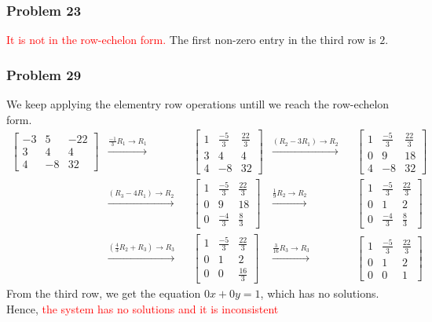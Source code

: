 \documentclass[a4paper,12pt]{article}
\begin{document}
\subsubsection*{Problem 23}
\textcolor{red}{It is not in the row-echelon form.} The first non-zero entry in the third row is $2$.
\subsubsection*{Problem 29}
We keep applying the elementry row operations untill we reach the row-echelon form.
\begin{align*}\begin{bmatrix}
  -3 & 5 & -22 \\
  3 & 4 & 4 \\
  4 & -8 & 32
\end{bmatrix}
&\xrightarrow{\frac{-1}{3}R_1\to R_1}& &\begin{bmatrix}
  1 & \frac{-5}{3} & \frac{22}{3} \\
  3 & 4 & 4 \\
  4 & -8 & 32
\end{bmatrix} &\xrightarrow{(R_2-3R_1)\to R_2}& &\begin{bmatrix}
  1 & \frac{-5}{3} & \frac{22}{3} \\
  0 & 9 & 18 \\
  4 & -8 & 32
\end{bmatrix}\\ &\xrightarrow{(R_3-4R_1)\to R_2}& &\begin{bmatrix}
  1 & \frac{-5}{3} & \frac{22}{3} \\
  0 & 9 & 18 \\
  0 & \frac{-4}{3} & \frac{8}{3}
\end{bmatrix} &\xrightarrow{\frac{1}{9}R_2\to R_2}& &\begin{bmatrix}
  1 & \frac{-5}{3} & \frac{22}{3} \\
  0 & 1 & 2 \\
  0 & \frac{-4}{3} & \frac{8}{3}
\end{bmatrix} \\ &\xrightarrow{(\frac{4}{3}R_2+R_3)\to R_3}& &\begin{bmatrix}
  1 & \frac{-5}{3} & \frac{22}{3} \\
  0 & 1 & 2 \\
  0 & 0 & \frac{16}{3}
\end{bmatrix} &\xrightarrow{\frac{3}{16}R_3\to R_3}& &\begin{bmatrix}
  1 & \frac{-5}{3} & \frac{22}{3} \\
  0 & 1 & 2 \\
  0 & 0 & 1
\end{bmatrix}
\end{align*}
From the third row, we get the equation $0x+0y=1$, which has no solutions. Hence, \textcolor{red}{the system has no solutions and it is inconsistent}
\end{document}
